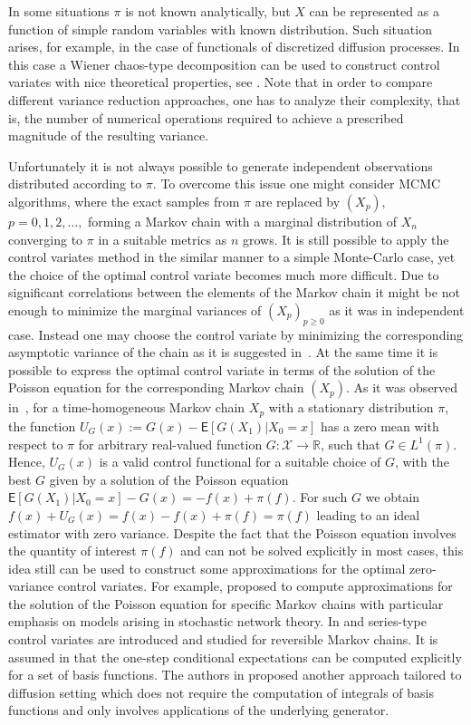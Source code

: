 \documentclass[bj]{imsart}
\def\PE{\mathsf{E}}
\def\rset{\mathbb{R}}
\def\rset{\mathbb{R}}
\begin{document}
In some situations \(\pi\) is not known analytically, but \(X\) can be represented as a function of  simple random variables with known distribution.
Such  situation arises, for example, in the case of functionals of  discretized diffusion processes. In this case a Wiener chaos-type decomposition can be used to construct control variates with nice theoretical properties, see \cite{belomestny2018stratified}.
Note that in order to compare different  variance reduction approaches, one has to analyze their complexity, that is, the number of numerical operations required to achieve a prescribed magnitude of the resulting variance.
\par
Unfortunately it is not always possible to generate independent observations distributed according to $\pi$. To overcome this issue one might consider MCMC algorithms, where the exact samples from $\pi$ are replaced by \((X_p),\) \(p=0,1,2,\ldots,\) forming a Markov chain with a marginal distribution of $X_n$ converging to $\pi$ in a suitable metrics as $n$ grows. It is still possible to apply the control variates method in the similar manner to a simple Monte-Carlo case, yet the choice of the optimal control variate becomes much more difficult. Due to significant correlations between the elements of the Markov chain it might be not enough to minimize the marginal variances of \((X_p)_{p \geq 0}\) as it was in independent case. Instead one may choose the control variate by minimizing the corresponding asymptotic variance of the chain as it is suggested in~\cite{belomestny2019esvm}. At the same time it is possible to express the optimal control variate in terms of the solution of the Poisson equation for the corresponding Markov chain \((X_p)\). As it was observed in~\cite{henderson1997variance,henderson2004}, for a time-homogeneous Markov chain \(X_p\) with a stationary distribution \(\pi\), the function $U_{G}(x) := G(x)-\PE[G(X_{1})|X_0 = x]$ has a zero mean with respect to $\pi$ for arbitrary real-valued function \(G: \mathcal{X} \to \rset\), such that \(G  \in L^1(\pi)\). Hence, $U_{G}(x)$ is a valid control functional for a suitable choice of $G$, with the best $G$ given by a solution of the Poisson equation \(\PE [G(X_{1})|X_0 = x]-G(x)=-f(x)+\pi(f)\). For such $G$ we obtain $f(x) + U_G(x) = f(x) - f(x) + \pi(f) = \pi(f)$ leading to an ideal estimator with zero variance. Despite the fact that the Poisson equation involves the quantity of interest \(\pi(f)\)  and can not be  solved explicitly in most cases, this idea still can be used to construct some  approximations for the optimal zero-variance control variates. For example,  \cite{henderson1997variance} proposed to compute approximations for the solution of the Poisson equation for specific Markov chains with particular emphasis on models arising in stochastic network theory. In \cite{dellaportas2012control} and \cite{brosse2018diffusion}  series-type control variates are introduced and studied for reversible Markov chains. It is assumed in \cite{dellaportas2012control}  that the one-step conditional expectations  can be computed explicitly  for a set of basis functions. The authors in \cite{brosse2018diffusion} proposed another approach tailored to diffusion setting which does not require the computation of integrals of basis functions and only involves  applications of the underlying generator.
\end{document}
